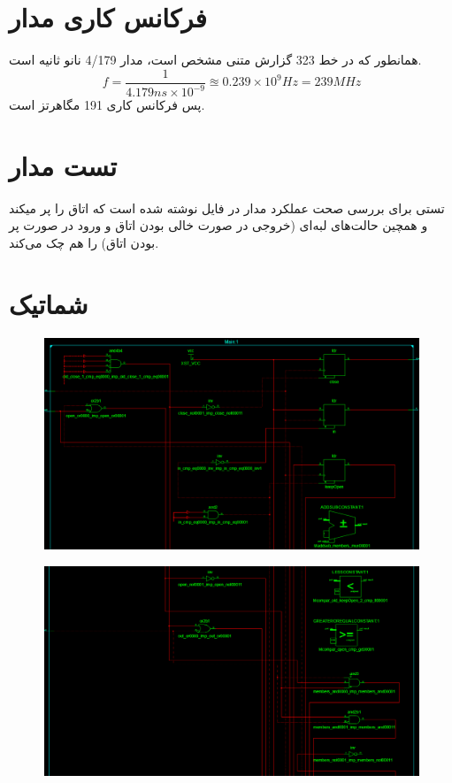 \documentclass[fleqn]{article}
\begin{document}
\section{فرکانس کاری مدار}
همانطور که در خط 323 گزارش متنی مشخص است،  مدار 4/179 نانو ثانیه 
است. 
$$
f = \frac{1}{4.179ns \times 10^{-9}} \approxeq 0.239 \times 10^9 Hz 
= 239 MHz
$$
پس فرکانس کاری 191 مگاهرتز است. 

\section{تست مدار}
تستی برای بررسی صحت عملکرد مدار در فایل 
نوشته شده است که اتاق را پر میکند و همچین حالت‌های لبه‌ای (خروجی در صورت خالی 
بودن اتاق و ورود در صورت پر بودن اتاق) را هم چک می‌کند.

\section{شماتیک}
\begin{figure}[H]
	\centering
	\includegraphics[width=.5\paperwidth]{./Schematic/1.png}
\end{figure}
\begin{figure}[H]
	\centering
	\includegraphics[width=.5\paperwidth]{./Schematic/2.png}
\end{figure}
\end{document}
